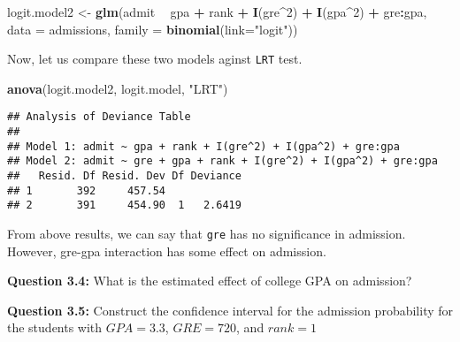 \documentclass[]{article}
\newenvironment{Shaded}{\begin{snugshade}}{\end{snugshade}}
\newcommand{\DataTypeTok}[1]{\textcolor[rgb]{0.13,0.29,0.53}{#1}}
\newcommand{\DecValTok}[1]{\textcolor[rgb]{0.00,0.00,0.81}{#1}}
\newcommand{\KeywordTok}[1]{\textcolor[rgb]{0.13,0.29,0.53}{\textbf{#1}}}
\newcommand{\NormalTok}[1]{#1}
\newcommand{\OperatorTok}[1]{\textcolor[rgb]{0.81,0.36,0.00}{\textbf{#1}}}
\newcommand{\StringTok}[1]{\textcolor[rgb]{0.31,0.60,0.02}{#1}}
\begin{document}
\begin{Shaded}
\begin{Highlighting}[]
\NormalTok{logit.model2 <-}\StringTok{ }\KeywordTok{glm}\NormalTok{(admit }\OperatorTok{~}\StringTok{   }\NormalTok{gpa }\OperatorTok{+}\StringTok{ }\NormalTok{rank }\OperatorTok{+}\StringTok{ }\KeywordTok{I}\NormalTok{(gre}\OperatorTok{^}\DecValTok{2}\NormalTok{) }\OperatorTok{+}\StringTok{ }\KeywordTok{I}\NormalTok{(gpa}\OperatorTok{^}\DecValTok{2}\NormalTok{) }\OperatorTok{+}\StringTok{ }\NormalTok{gre}\OperatorTok{:}\NormalTok{gpa, }\DataTypeTok{data =}\NormalTok{ admissions, }\DataTypeTok{family =} \KeywordTok{binomial}\NormalTok{(}\DataTypeTok{link=}\StringTok{"logit"}\NormalTok{))}
\end{Highlighting}
\end{Shaded}

Now, let us compare these two models aginst \texttt{LRT} test.

\begin{Shaded}
\begin{Highlighting}[]
\KeywordTok{anova}\NormalTok{(logit.model2, logit.model, }\StringTok{"LRT"}\NormalTok{)}
\end{Highlighting}
\end{Shaded}

\begin{verbatim}
## Analysis of Deviance Table
## 
## Model 1: admit ~ gpa + rank + I(gre^2) + I(gpa^2) + gre:gpa
## Model 2: admit ~ gre + gpa + rank + I(gre^2) + I(gpa^2) + gre:gpa
##   Resid. Df Resid. Dev Df Deviance
## 1       392     457.54            
## 2       391     454.90  1   2.6419
\end{verbatim}

From above results, we can say that \texttt{gre} has no significance in
admission. However, gre-gpa interaction has some effect on admission.

\textbf{Question 3.4:} What is the estimated effect of college GPA on
admission?

\textbf{Question 3.5:} Construct the confidence interval for the
admission probability for the students with \(GPA = 3.3\),
\(GRE = 720\), and \(rank=1\)
\end{document}
